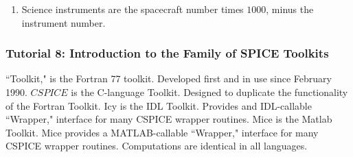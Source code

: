 \documentclass[crop=false,class=article,oneside]{standalone}
\begin{document}
\begin{enumerate}
\begin{itemize}
                \end{itemize}
                \item Science instruments are the spacecraft number times $1000$, minus the instrument number.
                \begin{itemize}
                \end{itemize}
            \end{enumerate}
            \subsubsection{Tutorial 8: Introduction to the Family of SPICE Toolkits}
            ``Toolkit," is the Fortran 77 toolkit. Developed first and in use since February 1990. $CSPICE$ is the C-language Toolkit. Designed to duplicate the functionality of the Fortran Toolkit. Icy is the IDL Toolkit. Provides and IDL-callable ``Wrapper," interface for many CSPICE wrapper routines. Mice is the Matlab Toolkit. Mice provides a MATLAB-callable ``Wrapper," interface for many CSPICE wrapper routines. Computations are identical in all languages. 
\end{document}
